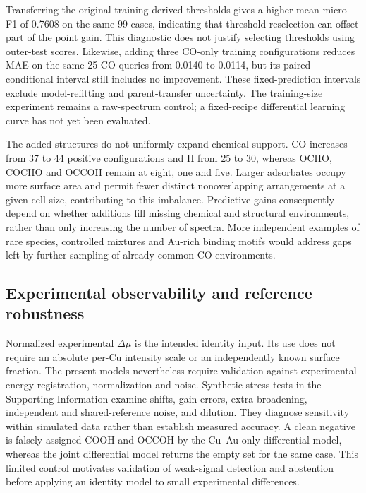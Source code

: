 \documentclass[11pt,a4paper]{article}
\begin{document}
Transferring the original training-derived thresholds gives a higher mean micro F1 of 0.7608 on the same 99 cases, indicating that threshold reselection can offset part of the point gain. This diagnostic does not justify selecting thresholds using outer-test scores. Likewise, adding three CO-only training configurations reduces MAE on the same 25 CO queries from 0.0140 to 0.0114, but its paired conditional interval still includes no improvement. These fixed-prediction intervals exclude model-refitting and parent-transfer uncertainty. The training-size experiment remains a raw-spectrum control; a fixed-recipe differential learning curve has not yet been evaluated.

The added structures do not uniformly expand chemical support. CO increases from 37 to 44 positive configurations and H from 25 to 30, whereas OCHO, COCHO and OCCOH remain at eight, one and five. Larger adsorbates occupy more surface area and permit fewer distinct nonoverlapping arrangements at a given cell size, contributing to this imbalance. Predictive gains consequently depend on whether additions fill missing chemical and structural environments, rather than only increasing the number of spectra. More independent examples of rare species, controlled mixtures and Au-rich binding motifs would address gaps left by further sampling of already common CO environments.

\subsection{Experimental observability and reference robustness}
Normalized experimental $\Delta\mu$ is the intended identity input. Its use does not require an absolute per-Cu intensity scale or an independently known surface fraction. The present models nevertheless require validation against experimental energy registration, normalization and noise. Synthetic stress tests in the Supporting Information examine shifts, gain errors, extra broadening, independent and shared-reference noise, and dilution. They diagnose sensitivity within simulated data rather than establish measured accuracy. A clean negative is falsely assigned COOH and OCCOH by the Cu--Au-only differential model, whereas the joint differential model returns the empty set for the same case. This limited control motivates validation of weak-signal detection and abstention before applying an identity model to small experimental differences.
\end{document}
